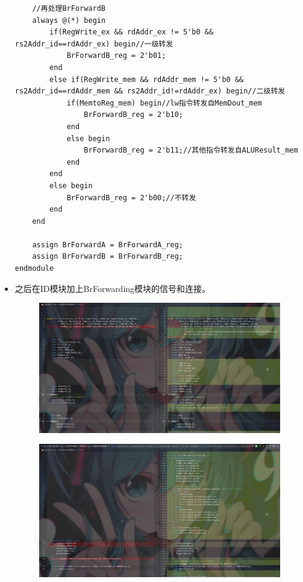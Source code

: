 \documentclass[12pt,hyperref,a4paper,UTF8]{ctexart}
\begin{document}
\begin{itemize}
\begin{lstlisting}
    //再处理BrForwardB
    always @(*) begin
        if(RegWrite_ex && rdAddr_ex != 5'b0 && rs2Addr_id==rdAddr_ex) begin//一级转发
            BrForwardB_reg = 2'b01;
        end
        else if(RegWrite_mem && rdAddr_mem != 5'b0 && rs2Addr_id==rdAddr_mem && rs2Addr_id!=rdAddr_ex) begin//二级转发
            if(MemtoReg_mem) begin//lw指令转发自MemDout_mem
                BrForwardB_reg = 2'b10;
            end
            else begin
                BrForwardB_reg = 2'b11;//其他指令转发自ALUResult_mem
            end
        end
        else begin
            BrForwardB_reg = 2'b00;//不转发
        end
    end

    assign BrForwardA = BrForwardA_reg;
    assign BrForwardB = BrForwardB_reg;
endmodule
    \end{lstlisting}
    \item 之后在ID模块加上BrForwarding模块的信号和连接。
    \begin{figure}[H]
        \centering
        \includegraphics[width=1\textwidth]{figures/fig/image25.png}
    \end{figure}
    \begin{figure}[H]
        \centering
        \includegraphics[width=1\textwidth]{figures/fig/image26.png}

\end{figure}
\end{itemize}
\end{document}
